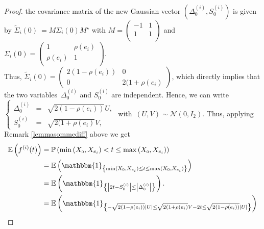 \documentclass[12pt]{article}
\renewcommand{\tilde}{\widetilde}
\theoremstyle{Theorem}
\begin{document}
\begin{proof}
the covariance matrix of the new Gaussian vector $\left(\Delta^{\scriptscriptstyle (i)}_{\scriptscriptstyle 0}, S^{\scriptscriptstyle (i)}_{\scriptscriptstyle 0}\right)$ is given by ${\tilde{\Sigma}_{i}(0)~= M\Sigma_{i}(0) M^{\star}}$ with {\small $M = \begin{pmatrix}
-1 & 1 \\
1 & 1  \\
\end{pmatrix}$} and $\Sigma_{i}(0) = \begin{pmatrix} 1 & \rho(e_i) \\
\rho(e_i) & 1  \\ 
\end{pmatrix}.$ \\
Thus, $\tilde{\Sigma}_{i}(0) = \begin{pmatrix}  2(1-\rho(e_i)) & 0 \\ 0 & 2(1+\rho(e_i)  \end{pmatrix}$, which directly  implies that the two variables~$\Delta^{\scriptscriptstyle (i)}_{\scriptscriptstyle 0}$ and $S^{\scriptscriptstyle (i)}_{\scriptscriptstyle 0}$ are independent. Hence, we can write
$\left\{
 \begin{array}{rlc}
  \Delta^{\scriptscriptstyle (i)}_{\scriptscriptstyle 0} & = & \sqrt{2(1-\rho(e_i))}U, \\
  S^{\scriptscriptstyle (i)}_{\scriptscriptstyle 0} & = & \sqrt{2(1+\rho(e_i)}V, 
\end{array}
\right.$ \linebreak with~$(U, V) \sim \mathcal{N}\left(0, I_{2}\right)$. Thus, applying Remark \ref{lemmasommediff} above we get 
{\small
\begin{align*}
\mathbb{E}\left(f^{(i)}(t)\right) & = \mathbb{P}\left(\min\left(X_{\scriptscriptstyle 0}, X_{e_i}\right) < t \leq \max\left(X_{\scriptscriptstyle 0}, X_{e_i}\right)\right) \\
& = \mathbb{E}\left(\mathbbm{1}_{\left\{\min(X_{\scriptscriptstyle 0}, X_{e_i}) \leq t \leq \max(X_{\scriptscriptstyle 0}, X_{e_i})\right\}}\right) \\
& = \mathbb{E}\left(\mathbbm{1}_{\left\{ \left|2t - S^{\scriptscriptstyle (i)}_{\scriptscriptstyle 0}\right| \leq \left|\Delta^{\scriptscriptstyle (i)}_{\scriptscriptstyle 0}\right|\right\}}\right). \\
& = \mathbb{E}\left(\mathbbm{1}_{\left\{ - \sqrt{2(1-\rho(e_i))}\left|U\right| \leq  \sqrt{2(1+\rho(e_i)}V -2t \leq \sqrt{2(1-\rho(e_i))}\left|U\right| \right\}}\right) \\

\end{align*}}
\end{proof}
\end{document}

